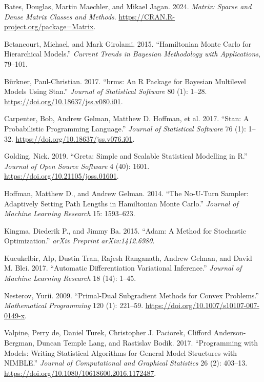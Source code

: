 \documentclass[
  11pt,
]{article}
\newlength{\cslhangindent}
\newenvironment{CSLReferences}[2] %
 {\begin{list}{}{%
  \setlength{\itemindent}{0pt}
  \setlength{\leftmargin}{0pt}
  \setlength{\parsep}{0pt}
  \ifodd #1
   \setlength{\leftmargin}{\cslhangindent}
   \setlength{\itemindent}{-1\cslhangindent}
  \fi
  \setlength{\itemsep}{#2\baselineskip}}}
 {\end{list}}
\begin{document}
\protect{}\label{refs}
\begin{CSLReferences}{1}{1}
Bates, Douglas, Martin Maechler, and Mikael Jagan. 2024. \emph{Matrix:
Sparse and Dense Matrix Classes and Methods}.
\url{https://CRAN.R-project.org/package=Matrix}.

Betancourt, Michael, and Mark Girolami. 2015. {``Hamiltonian {M}onte
{C}arlo for Hierarchical Models.''} \emph{Current Trends in Bayesian
Methodology with Applications}, 79--101.

Bürkner, Paul-Christian. 2017. {``{brms}: An {R} Package for {B}ayesian
Multilevel Models Using {Stan}.''} \emph{Journal of Statistical
Software} 80 (1): 1--28. \url{https://doi.org/10.18637/jss.v080.i01}.

Carpenter, Bob, Andrew Gelman, Matthew D. Hoffman, et al. 2017. {``Stan:
A Probabilistic Programming Language.''} \emph{Journal of Statistical
Software} 76 (1): 1--32. \url{https://doi.org/10.18637/jss.v076.i01}.

Golding, Nick. 2019. {``Greta: Simple and Scalable Statistical Modelling
in {R}.''} \emph{Journal of Open Source Software} 4 (40): 1601.
\url{https://doi.org/10.21105/joss.01601}.

Hoffman, Matthew D., and Andrew Gelman. 2014. {``The No-{U}-Turn
Sampler: Adaptively Setting Path Lengths in {H}amiltonian {M}onte
{C}arlo.''} \emph{Journal of Machine Learning Research} 15: 1593--623.

Kingma, Diederik P., and Jimmy Ba. 2015. {``Adam: A Method for
Stochastic Optimization.''} \emph{arXiv Preprint arXiv:1412.6980}.

Kucukelbir, Alp, Dustin Tran, Rajesh Ranganath, Andrew Gelman, and David
M. Blei. 2017. {``Automatic Differentiation Variational Inference.''}
\emph{Journal of Machine Learning Research} 18 (14): 1--45.

Nesterov, Yurii. 2009. {``Primal-Dual Subgradient Methods for Convex
Problems.''} \emph{Mathematical Programming} 120 (1): 221--59.
\url{https://doi.org/10.1007/s10107-007-0149-x}.

Valpine, Perry de, Daniel Turek, Christopher J. Paciorek, Clifford
Anderson-Bergman, Duncan Temple Lang, and Rastislav Bodik. 2017.
{``Programming with Models: Writing Statistical Algorithms for General
Model Structures with {NIMBLE}.''} \emph{Journal of Computational and
Graphical Statistics} 26 (2): 403--13.
\url{https://doi.org/10.1080/10618600.2016.1172487}.

\end{CSLReferences}
\end{document}

